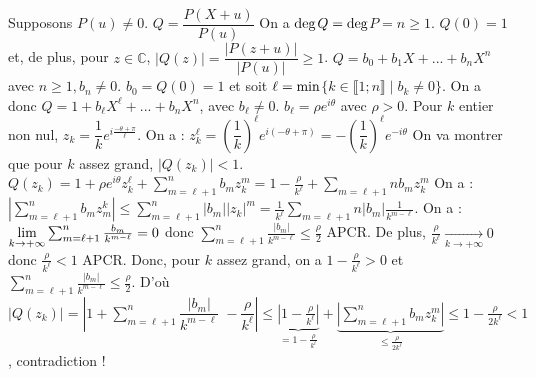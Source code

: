 \documentclass[12pt,a4paper]{report}
\begin{document}
\newline \newline \par {}
\newline Supposons $P(u) \neq 0$. $Q = \dfrac{P(X+u)}{P(u)}$
\newline \newline On a $\rm{deg}$$Q = \rm{deg}$$P = n \geq 1$. $Q(0) = 1$ et, de plus, pour $z \in \mathbb{C}$, $\lvert Q(z) \rvert = \dfrac{\lvert P(z+u) \rvert}{\lvert P(u)\rvert} \geq 1$.
\newline $Q = b_0 + b_1X + ... + b_n X^n$ avec $n \geq 1, b_n \neq 0$.
\newline $b_0 = Q(0) = 1$ et soit $\ell = \rm{min}$$ \{ k \in \llbracket 1;n \rrbracket \mid b_k \neq 0 \}$. On a donc $Q = 1 + b_\ell X^\ell + ... + b_n X^n$, avec $b_\ell \neq 0$.
\newline $b_\ell = \rho e^{i\theta}$ avec $\rho > 0$. Pour $k$ entier non nul, $z_k = \dfrac{1}{k} e^{i\frac{-\theta+\pi}{\ell}}$. On a : $z_k^\ell = \left(\dfrac{1}{k}\right)^\ell e^{i(-\theta+\pi)} = -\left(\dfrac{1}{k}\right)^\ell e^{-i\theta}$
\newline \newline On va montrer que pour $k$ assez grand, $\lvert Q(z_k) \rvert < 1$.
\newline $Q(z_k) = 1+ \rho e^{i\theta}z_k^\ell + \sum_{m=\ell+1}^{n}b_mz_k^m = 1 - \frac{\rho}{k^\ell} + \sum_{m=\ell+1}{n} b_m z_k^m$
\newline On a : $\left \lvert \sum_{m=\ell+1}^{n}b_mz^k_m \right \rvert \leq \sum_{m=\ell+1}^{n} \lvert b_m \rvert \lvert z_k \rvert ^m = \frac{1}{k^\ell} \sum_{m=\ell+1}{n} \lvert b_m \rvert \frac{1}{k^{m-\ell}}$.
\newline On a : $\underset{k \rightarrow +\infty}{\rm{lim}} \sum_{m=\ell+1}^n \frac{b_m}{k^{m-\ell}} = 0$ donc $\sum_{m=\ell+1}^n \frac{\lvert b_m \rvert}{k^{m-\ell}} \leq \frac{\rho}{2}$ APCR.
\newline De plus, $\frac{\rho}{k^\ell} \xrightarrow[k \rightarrow +\infty]{} 0$ donc $\frac{\rho}{k^\ell} < 1$ APCR.
\newline Donc, pour $k$ assez grand, on a $1 - \frac{\rho}{k^\ell} > 0$ et $\sum_{m=\ell+1}^n \frac{\lvert b_m \rvert}{k^{m-\ell}} \leq \frac{\rho}{2}$.
\newline \newline  D'où $\lvert Q(z_k) \rvert = \left \lvert 1+ \displaystyle{\sum_{m=\ell+1}^n \dfrac{\lvert b_m \rvert}{k^{m-\ell}}}\;- \dfrac{\rho}{k^\ell} \right \rvert \leq \underbrace{\left \lvert 1- \frac{\rho}{k^\ell} \right \rvert}_{=1-\frac{\rho}{k^\ell}} + \underbrace{\left \lvert \sum_{m=\ell+1}^n b_mz_k^m \right \rvert}_{\leq \frac{\rho}{2k^\ell}} \leq 1-\frac{\rho}{2k^\ell} < 1$, contradiction !
\end{document}
